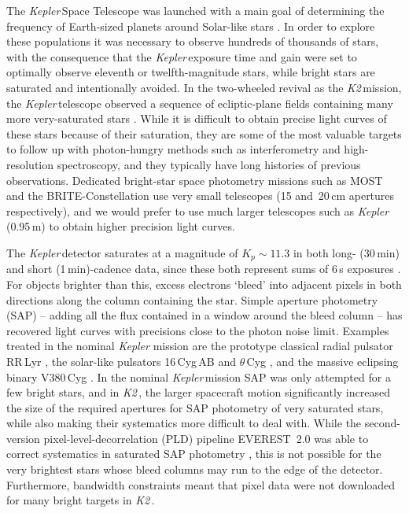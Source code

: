 \documentclass[modern]{aastex62}
\newcommand\kepler{\emph{Kepler}\,}
\newcommand\ktwo{\emph{K2}\,}
\begin{document}
The \kepler Space Telescope was launched with a main goal of determining the frequency of Earth-sized planets around Solar-like stars \citep{2010sci...327..977b}. In order to explore these populations it was necessary to observe hundreds of thousands of stars, with the consequence that the \kepler exposure time and gain were set to optimally observe eleventh or twelfth-magnitude stars, while bright stars are saturated and intentionally avoided. In the two-wheeled revival as the \ktwo mission, the \kepler telescope observed a sequence of ecliptic-plane fields containing many more very-saturated stars \citep{2014PASP..126..398H}. While it is difficult to obtain precise light curves of these stars because of their saturation, they are some of the most valuable targets to follow up with photon-hungry methods such as interferometry and high-resolution spectroscopy, and they typically have long histories of previous observations. Dedicated bright-star space photometry missions such as MOST \citep{most} and the BRITE-Constellation \citep{brite,brite2} use very small telescopes (15 and~20\,cm apertures respectively), and we would prefer to use much larger telescopes such as \kepler (0.95\,m) to obtain higher precision light curves. 

The \kepler detector saturates at a magnitude of $K_p \sim 11.3$ in both long- (30\,min) and short (1\,min)-cadence data, since these both represent sums of 6\,s exposures \citep{Gilliland2010}. For objects brighter than this, excess electrons `bleed' into adjacent pixels in both directions along the column containing the star. Simple aperture photometry (SAP) -- adding all the flux contained in a window around the bleed column -- has recovered light curves with precisions close to the photon noise limit. Examples treated in the nominal {\it Kepler\/} mission are the prototype classical radial pulsator RR\,Lyr \citep[$V=7.2$;][]{Kolenberg2011}, the solar-like pulsators 16\,Cyg\,AB \citep[$V\approx 6$;][]{2013MNRAS.433.1262W} and $\theta\,$Cyg \citep[$V=4.48$;][]{Guzik2016}, and the massive eclipsing binary V380\,Cyg \citep[$V=5.68$;][]{tkachenko2014}. In the nominal \kepler mission SAP was only attempted for a few bright stars, and in \ktwo, the larger spacecraft motion significantly increased the size of the required apertures for SAP photometry of very saturated stars, while also making their systematics more difficult to deal with. While the second-version pixel-level-decorrelation (PLD) pipeline EVEREST~2.0 was able to correct systematics in saturated SAP photometry \citep{everest2}, this is not possible for the very brightest stars whose bleed columns may run to the edge of the detector. Furthermore, bandwidth constraints meant that pixel data were not downloaded for many bright targets in \ktwo. 
\end{document}
